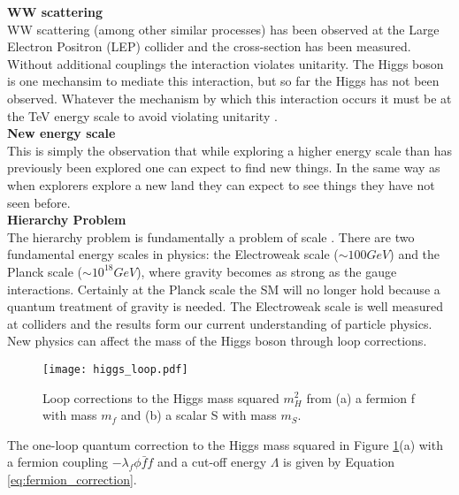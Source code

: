 {\bf WW scattering} \\

WW scattering (among other similar processes) has been observed at the Large 
Electron Positron (LEP) collider and the cross-section has been measured. 
Without additional couplings the interaction violates unitarity. The Higgs boson 
is one mechansim to mediate this interaction, but so far the Higgs has not been 
observed. Whatever the mechanism by which this interaction occurs it must be at 
the TeV energy scale to avoid violating unitarity \cite{halzen_and_martin}. \\

{\bf New energy scale} \\

This is simply the observation that while exploring a higher energy scale than
has previously been explored one can expect to find new things. In the same
way as when explorers explore a new land they can expect to see things they
have not seen before. \\

{\bf Hierarchy Problem} \\

The hierarchy problem is fundamentally a problem of scale \cite{dvali}. There 
are two fundamental energy scales in physics: the Electroweak scale 
($\sim100\unit{GeV}$) and the Planck scale ($\sim10^{18}\unit{GeV}$), where 
gravity becomes as strong as the gauge interactions. Certainly at the Planck 
scale the SM will no longer hold because a quantum treatment of 
gravity is needed. The Electroweak scale is well measured at colliders and the 
results form our current understanding of particle physics. New physics can
affect the mass of the Higgs boson through loop corrections. \\

\begin{figure}
\begin{center}
\texttt{[image: higgs\_loop.pdf]}
\end{center}
\caption{Loop corrections to the Higgs mass squared $m_{H}^{2}$ from (a) a 
fermion f with mass $m_{f}$ and (b) a scalar S with mass $m_{S}$.}
\label{fig:higgs_loop}
\end{figure}

The one-loop quantum correction to the Higgs mass squared in Figure 
\ref{fig:higgs_loop}(a) with a fermion coupling $-\lambda_{f}\phi\bar{f}f$ and 
a cut-off energy $\Lambda$ is given by Equation \ref{eq:fermion_correction}.

